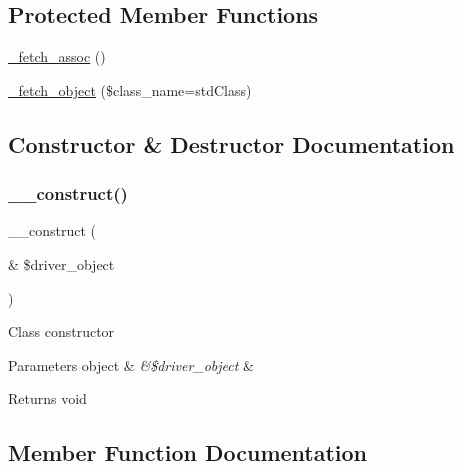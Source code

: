 \subsection*{Protected Member Functions}
\begin{DoxyCompactItemize}
\item 
\mbox{\hyperlink{class_c_i___d_b__oci8__result_a43a9a92817f1334a1c10752ec44275a0}{\+\_\+fetch\+\_\+assoc}} ()
\item 
\mbox{\hyperlink{class_c_i___d_b__oci8__result_a60806be6a9c2488820813c2a7f4fef71}{\+\_\+fetch\+\_\+object}} (\$class\+\_\+name=\textquotesingle{}std\+Class\textquotesingle{})
\end{DoxyCompactItemize}


\subsection{Constructor \& Destructor Documentation}
\mbox{\label{class_c_i___d_b__oci8__result_a8e093c8b6e5733bc3f306385ee426ab7}} 
\subsubsection{\texorpdfstring{\+\_\+\+\_\+construct()}{\_\_construct()}}
{\footnotesize\ttfamily \+\_\+\+\_\+construct (\begin{DoxyParamCaption}\item[{\&}]{\$driver\+\_\+object }\end{DoxyParamCaption})}

Class constructor


\begin{DoxyParams}[1]{Parameters}
object & {\em \&\$driver\+\_\+object} & \\
\hline
\end{DoxyParams}
\begin{DoxyReturn}{Returns}
void 
\end{DoxyReturn}


\subsection{Member Function Documentation}
\mbox{\label{class_c_i___d_b__oci8__result_a43a9a92817f1334a1c10752ec44275a0}} 
